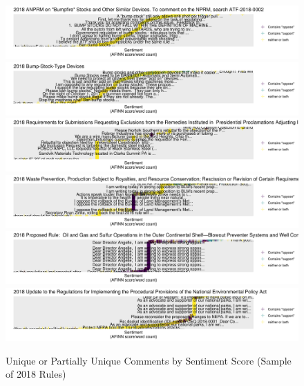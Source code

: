 \documentclass[
      12pt,
        ]{article}
\begin{document}
\begin{figure}
    \caption{Unique or Partially Unique Comments by Sentiment Score (Sample of 2018 Rules)}
    \label{fig:sentiment-2018}
    \centering
    \includegraphics[width = 7in]{../Figs/sent-2018ATF-2018-0001.png}
    \includegraphics[width = 7in]{../Figs/sent-2018ATF-2018-0002.png}
    \includegraphics[width = 7in]{../Figs/sent-2018BIS-2018-0006.png}
    \includegraphics[width = 7in]{../Figs/sent-2018BLM-2018-0001.png}
    \includegraphics[width = 7in]{../Figs/sent-2018BSEE-2018-0002.png}
    \includegraphics[width = 7in]{../Figs/sent-2018CEQ-2018-0001.png}
\end{figure}
\end{document}
